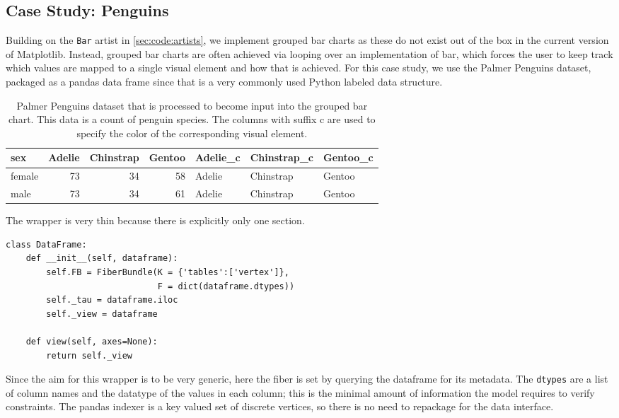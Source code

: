 \documentclass[../main.tex]{subfiles}
\begin{document}
\subsection{Case Study: Penguins}
\label{sec:code_case_study}
Building on the \texttt{Bar} artist in \autoref{sec:code:artists}, we implement grouped bar charts as these do not exist out of the box in the current version of Matplotlib. Instead, grouped bar charts are often achieved via looping over an implementation of bar, which forces the user to keep track which values are mapped to a single visual element and how that is achieved. For this case study, we use the Palmer Penguins dataset\cite{gormanEcologicalSexualDimorphism2014, horstPalmerpenguinsPalmerArchipelago2020}, packaged as a pandas data frame\cite{nakhaeeMcnakhaeePalmerpenguins2021} since that is a very commonly used Python labeled data structure. 

\begin{table}[H]
    \centering
\begin{tabular}{|l|r|r|r|l|l|l|}
    \toprule
       sex &  Adelie &  Chinstrap &  Gentoo & Adelie\_c & Chinstrap\_c & Gentoo\_c \\
    \midrule
     female &      73 &         34 &      58 &   Adelie &   Chinstrap &   Gentoo \\
     male &      73 &         34 &      61 &   Adelie &   Chinstrap &   Gentoo \\
    \bottomrule
\end{tabular}
\caption{Palmer Penguins dataset that is processed to become input into the grouped bar chart. This data is a count of penguin species. The columns with suffix c are used to specify the color of the corresponding visual element.}
\label{tab:code:penguins}
\end{table}
    

The wrapper is very thin because there is explicitly only one section.
\begin{verbatim}
class DataFrame:
    def __init__(self, dataframe):
        self.FB = FiberBundle(K = {'tables':['vertex']},
                              F = dict(dataframe.dtypes))
        self._tau = dataframe.iloc
        self._view = dataframe

    def view(self, axes=None):
        return self._view
\end{verbatim}
Since the aim for this wrapper is to be very generic, here the fiber is set by querying the dataframe for its metadata. The \texttt{dtypes} are a list of column names and the datatype of the values in each column; this is the minimal amount of information the model requires to verify constraints. The pandas indexer is a key valued set of discrete vertices, so there is no need to repackage for the data interface. 
\end{document}
